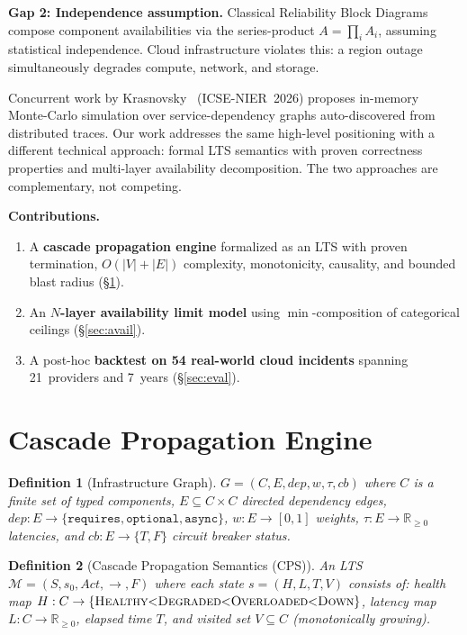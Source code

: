 \documentclass[conference,10pt]{IEEEtran}
\newtheorem{definition}{Definition}
\begin{document}
\textbf{Gap 2: Independence assumption.} Classical Reliability
Block Diagrams~\cite{trivedi2001} compose component availabilities
via the series-product $A = \prod_i A_i$, assuming statistical
independence. Cloud infrastructure violates this: a region outage
simultaneously degrades compute, network, and storage.

Concurrent work by Krasnovsky~\cite{krasnovsky2026} (ICSE-NIER~2026)
proposes in-memory Monte-Carlo simulation over service-dependency
graphs auto-discovered from distributed traces. Our work addresses
the same high-level positioning with a different technical approach:
formal LTS semantics with proven correctness properties and
multi-layer availability decomposition. The two approaches are
complementary, not competing.

\noindent\textbf{Contributions.}
\begin{enumerate}[nosep]
  \item A \textbf{cascade propagation engine} formalized as an LTS
    with proven termination, $O(|V|{+}|E|)$ complexity, monotonicity,
    causality, and bounded blast radius (\S\ref{sec:cascade}).
  \item An \textbf{$N$-layer availability limit model} using
    $\min$-composition of categorical ceilings (\S\ref{sec:avail}).
  \item A post-hoc \textbf{backtest on 54 real-world cloud incidents}
    spanning 21~providers and 7~years (\S\ref{sec:eval}).
\end{enumerate}

\section{Cascade Propagation Engine}\label{sec:cascade}

\begin{definition}[Infrastructure Graph]\label{def:graph}
$G = (C, E, \mathit{dep}, w, \tau, \mathit{cb})$ where $C$ is a
finite set of typed components, $E \subseteq C \times C$ directed
dependency edges, $\mathit{dep}: E \to \{\texttt{requires},
\texttt{optional}, \texttt{async}\}$, $w: E \to [0,1]$ weights,
$\tau: E \to \mathbb{R}_{\ge 0}$ latencies, and
$\mathit{cb}: E \to \{T, F\}$ circuit breaker status.
\end{definition}

\begin{definition}[Cascade Propagation Semantics (CPS)]
\label{def:cps}
An LTS $\mathcal{M} = (S, s_0, \mathit{Act}, {\longrightarrow}, F)$
where each state $s = (H, L, T, V)$ consists of:
health map $H: C \to \{\textsc{Healthy} {<} \textsc{Degraded} {<}
\textsc{Overloaded} {<} \textsc{Down}\}$,
latency map $L: C \to \mathbb{R}_{\ge 0}$,
elapsed time $T$, and visited set $V \subseteq C$
(monotonically growing).
\end{definition}
\end{document}

